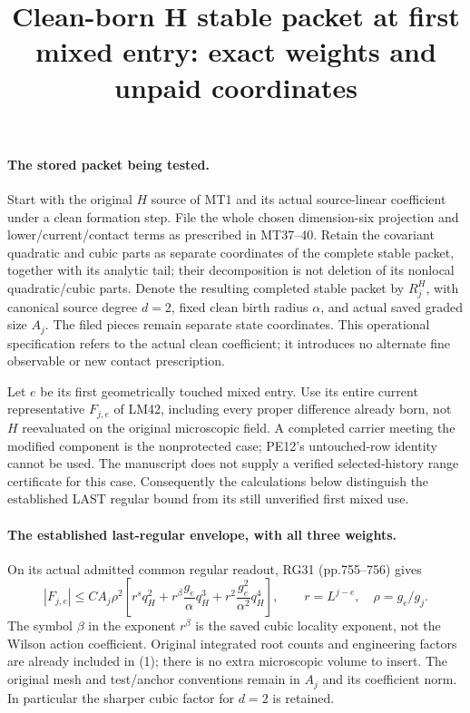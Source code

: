 \documentclass[11pt]{article}
\title{Clean-born H stable packet at first mixed entry: exact weights and unpaid coordinates}\author{}\date{}
\begin{document}
\maketitle
\paragraph{The stored packet being tested.}
Start with the original $H$ source of MT1 and its actual source-linear coefficient
under a clean formation step. File the whole chosen dimension-six projection and lower/current/contact terms
as prescribed in MT37--40. Retain the covariant quadratic and cubic parts as
separate coordinates of the complete stable packet, together with its analytic
tail; their decomposition is not deletion of its nonlocal quadratic/cubic parts. Denote the resulting completed stable packet by $R_j^H$, with canonical
source degree $d=2$, fixed clean birth radius $\alpha$, and actual saved graded size
$A_j$. The filed pieces remain separate state coordinates. This operational
specification refers to the actual clean coefficient; it introduces no alternate
fine observable or new contact prescription.

Let $e$ be its first geometrically touched mixed entry. Use its entire current
representative $F_{j,e}$ of LM42, including every proper difference already born,
not $H$ reevaluated on the original microscopic field. A completed carrier meeting
the modified component is the nonprotected case; PE12's untouched-row identity
cannot be used. The manuscript does not supply a verified selected-history
range certificate for this case. Consequently the calculations below distinguish
the established LAST regular bound from its still unverified first mixed use.

\paragraph{The established last-regular envelope, with all three weights.}
On its actual admitted common regular readout, RG31 (pp.755--756) gives
\[
 |F_{j,e}|\le C A_j\rho^2\left[
 r^s q_H^2+r^\beta\frac{g_e}{\alpha}q_H^3
       +r^2\frac{g_e^2}{\alpha^2}q_H^4\right],\qquad
 r=L^{j-e},\quad\rho=g_e/g_j.                         \tag{1}
\]
The symbol $\beta$ in the exponent $r^\beta$ is the saved cubic locality exponent,
not the Wilson action coefficient. Original integrated root counts and engineering
factors are already included in (1); there is no extra microscopic volume to insert.
The original mesh and test/anchor conventions remain in $A_j$ and its coefficient
norm. In particular the sharper cubic factor for $d=2$ is retained.
\end{document}
